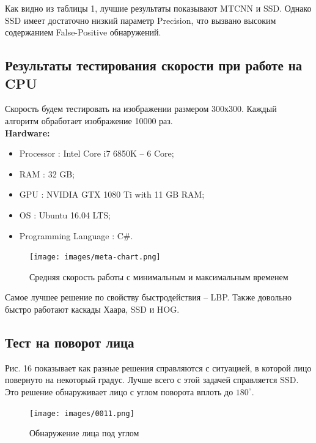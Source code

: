 \documentclass[14pt]{matmex-diploma-custom}
\begin{document}
    Как видно из таблицы 1, лучшие результаты показывают MTCNN и SSD. Однако SSD имеет достаточно низкий параметр Precision, что вызвано высоким содержанием False-Positive обнаружений. 
        
        \subsection{Результаты тестирования скорости при работе на CPU}
          Скорость будем тестировать на изображении размером 300х300. Каждый алгоритм обработает изображение 10000 раз. \\ 
        \textbf{Hardware:}
        \begin{itemize}
            \item Processor : Intel Core i7 6850K – 6 Core;
            \item RAM : 32 GB;
            \item GPU : NVIDIA GTX 1080 Ti with 11 GB RAM;
            \item OS : Ubuntu 16.04 LTS;
            \item Programming Language : C\#.
        \end{itemize}
        
        \begin{figure}[H]
                        \centering
                        \texttt{[image: images/meta-chart.png]}
                        \caption{Средняя скорость работы с минимальным и максимальным временем}
       \end{figure} 
        
        Самое лучшее решение по свойству быстродействия -- LBP. Также довольно быстро работают каскады Хаара, SSD и HOG.
        
        \subsection{Тест на поворот лица}
        Рис. 16 показывает как разные решения справляются с ситуацией, в которой лицо повернуто на некоторый градус. Лучше всего с этой задачей справляется SSD. Это решение обнаруживает лицо с углом поворота вплоть до $180^{\circ}$. 
        \begin{figure}[H]
                        \centering
                        \texttt{[image: images/0011.png]}
                        \caption{Обнаружение лица под углом}
       \end{figure}
        
\end{document}
